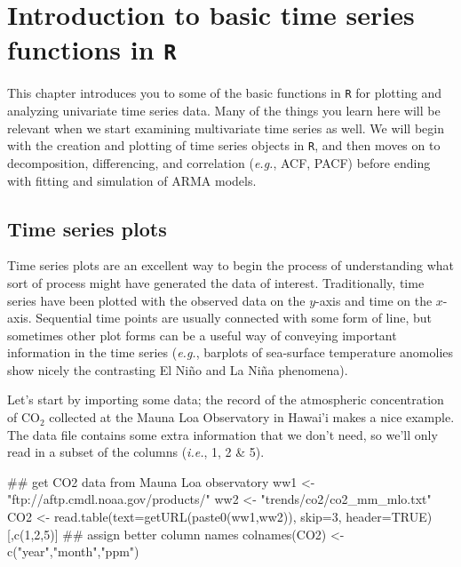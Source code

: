 

\chapter{Introduction to basic time series functions in \texttt{R}}
\label{chap:introTS}

This chapter introduces you to some of the basic functions in \texttt{R} for plotting and analyzing univariate time series data.  Many of the things you learn here will be relevant when we start examining multivariate time series as well.  We will begin with the creation and plotting of time series objects in \texttt{R}, and then moves on to decomposition, differencing, and correlation (\emph{e.g.}, ACF, PACF) before ending with fitting and simulation of ARMA models.

\section{Time series plots}

Time series plots are an excellent way to begin the process of understanding what sort of process might have generated the data of interest.  Traditionally, time series have been plotted with the observed data on the $y$-axis and time on the $x$-axis.  Sequential time points are usually connected with some form of line, but sometimes other plot forms can be a useful way of conveying important information in the time series (\emph{e.g.}, barplots of sea-surface temperature anomolies show nicely the contrasting El Ni{\~n}o and La Ni{\~n}a phenomena).

Let's start by importing some data; the record of the atmospheric concentration of CO$_2$ collected at the Mauna Loa Observatory in Hawai'i makes a nice example.  The data file contains some extra information that we don't need, so we'll only read in a subset of the columns (\emph{i.e.}, 1, 2 \& 5).

\begin{Schunk}
\begin{Sinput}
 ## get CO2 data from Mauna Loa observatory
 ww1 <- "ftp://aftp.cmdl.noaa.gov/products/"
 ww2 <- "trends/co2/co2_mm_mlo.txt"
 CO2 <- read.table(text=getURL(paste0(ww1,ww2)), skip=3, header=TRUE)[,c(1,2,5)]
 ## assign better column names
 colnames(CO2) <- c("year","month","ppm")
\end{Sinput}
\end{Schunk}
